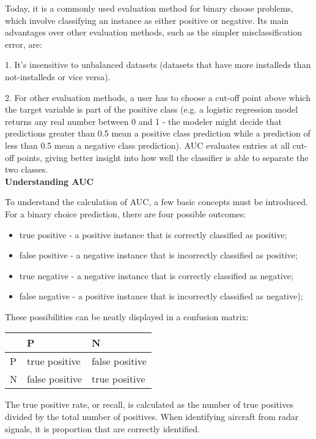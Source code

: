 \documentclass[11pt]{article}
\begin{document}
Today, it is a commonly used evaluation method for binary choose problems, which involve classifying an instance as either positive or negative. Its main advantages over other evaluation methods, such as the simpler misclassification error, are:  

1. It's insensitive to unbalanced datasets (datasets that have more installeds than not-installeds or vice versa).

2. For other evaluation methods, a user has to choose a cut-off point above which the target variable is part of the positive class (e.g. a logistic regression model returns any real number between 0 and 1 - the modeler might decide that predictions greater than 0.5 mean a positive class prediction while a prediction of less than 0.5 mean a negative class prediction). AUC evaluates entries at all cut-off points, giving better insight into how well the classifier is able to separate the two classes. \\

\textbf{Understanding AUC}

To understand the calculation of AUC, a few basic concepts must be introduced. For a binary choice prediction, there are four possible outcomes:
\begin{itemize}
\item true positive - a positive instance that is correctly classified as positive;
\item false positive - a negative instance that is incorrectly classified as positive;
\item true negative - a negative instance that is correctly classified as negative;
\item false negative - a positive instance that is incorrectly classified as negative);
\end{itemize}

These possibilities can be neatly displayed in a confusion matrix:

\begin{center}
\begin{tabular}{|l|l|l|}
\hline
  & P             & N \\ \hline
P & true positive & false positive \\ \hline
N & false positive & true positive \\
\hline
\end{tabular}
\end{center}

The true positive rate, or recall, is calculated as the number of true positives divided by the total number of positives. When identifying aircraft from radar signals, it is proportion that are correctly identified.
\end{document}
